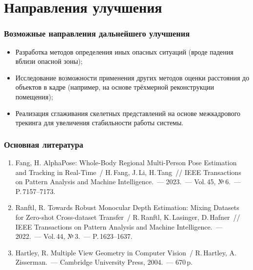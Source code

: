 \section{Направления улучшения}
\begin{frame}
    \frametitle{Возможные направления дальнейшего улучшения}
    \begin{itemize}
        \item Разработка методов определения иных опасных ситуаций (вроде падения вблизи опасной зоны);
        \item Исследование возможности применения других методов оценки расстояния до объектов в кадре (например, на основе трёхмерной реконструкции помещения);
        \item Реализация сглаживания скелетных представлений на основе межкадрового трекинга для увеличения стабильности работы системы.
    \end{itemize}
\end{frame}

\begin{frame}
    \frametitle{Основная литература}
    \begin{enumerate}
        \item Fang, H. AlphaPose: Whole-Body Regional Multi-Person
        Pose Estimation and Tracking in Real-Time~/ H.\,Fang, J.\,Li, H.\,Tang~// IEEE Transactions on Pattern Analysis and Machine Intelligence.~---
        2023.~--- Vol.\,45, №\,6.~--- P.\,7157--7173.

        \item Ranftl, R. Towards Robust Monocular Depth Estimation: Mixing Datasets for Zero-shot Cross-dataset Transfer~/ R.\,Ranftl, K.\,Lasinger, D.\,Hafner~// IEEE Transactions on Pattern Analysis and Machine Intelligence.~--- 2022.~--- Vol.\,44, №\,3.~--- P.\,1623--1637.

        \item Hartley, R. Multiple View Geometry in Computer Vision~/ R.\,Hartley, A.\,Zisserman.~--- Cambridge University Press, 2004.~--- 670\,p.
    \end{enumerate}

\end{frame}
